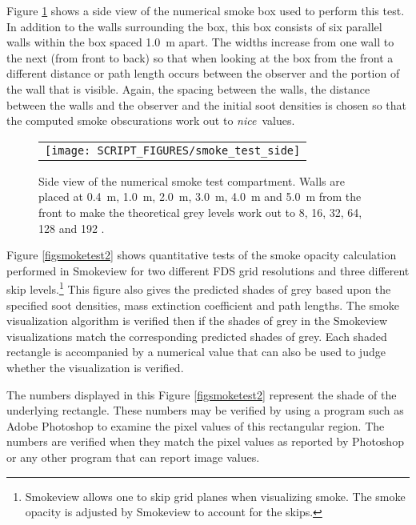 \documentclass[11pt,twoside]{book}
\newcommand{\figoptions}{hbp}
\begin{document}
Figure \ref{figsmoketestgeom} shows a side view of the numerical smoke box used to perform this test.  In addition to the walls surrounding the box, this box consists of  six parallel walls within the box spaced 1.0~m apart.  The widths increase from one wall to the next (from front to back) so that when looking at the box from the front a different distance or path length occurs between the observer and the portion of the wall that is visible.
Again, the spacing between the walls, the distance between the walls and the observer and the initial soot densities is chosen so that the computed smoke obscurations work out to {\em nice}\ values.

\begin{figure}[\figoptions]
\begin{center}
 \centering
\begin{tabular}{c}
 \texttt{[image: SCRIPT\_FIGURES/smoke\_test\_side]}
 \end{tabular}
\end{center}
 \caption[Side view of numerical smoke test compartment.]{Side view of the numerical smoke test compartment.  Walls are placed at 0.4~m, 1.0~m, 2.0~m, 3.0~m, 4.0~m and 5.0~m from the front to make the theoretical grey levels work out to 8, 16, 32, 64, 128 and 192 .}
\label{figsmoketestgeom}%
\end{figure}

Figure \ref{figsmoketest2} shows quantitative tests of the smoke opacity calculation performed in Smokeview for two different FDS grid resolutions and three different skip levels.\footnote{Smokeview allows one to skip grid planes when visualizing smoke.  The smoke opacity is adjusted by Smokeview to account for the skips.} This figure also gives the predicted shades of grey based upon the specified soot densities, mass extinction coefficient and path lengths.  The smoke visualization algorithm is verified then if the shades of grey in the Smokeview visualizations match the corresponding predicted shades of grey.  Each shaded
rectangle is accompanied by a numerical value that can also be used to judge whether the visualization is verified.

The numbers displayed in this Figure \ref{figsmoketest2} represent the shade of the underlying rectangle.  These numbers may be verified by using a program such as Adobe Photoshop to examine the pixel values of this rectangular region.  The numbers are verified when they match the pixel values as reported by Photoshop or any other program that can report image values.
\end{document}
